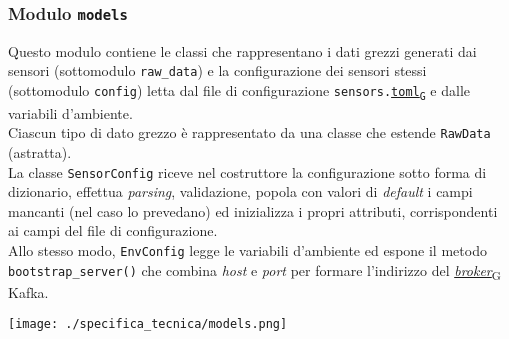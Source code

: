 \subsubsection{Modulo \texttt{models}}
Questo modulo contiene le classi che rappresentano i dati grezzi generati dai sensori (sottomodulo \texttt{raw\_data}) e la configurazione dei sensori stessi (sottomodulo \texttt{config}) letta
dal file di configurazione \texttt{sensors.\href{https://7last.github.io/docs/pb/documentazione-interna/glossario\#tom's-obvious-minimal-language}{toml\textsubscript{G}}} e dalle variabili d'ambiente.\\
Ciascun tipo di dato grezzo è rappresentato da una classe che estende \texttt{RawData} (astratta).\\
La classe \texttt{SensorConfig} riceve nel costruttore la configurazione sotto forma di dizionario, effettua \textit{parsing}, validazione,
popola con valori di \textit{default} i campi mancanti (nel caso lo prevedano) ed inizializza i propri attributi, corrispondenti ai campi del file di configurazione.\\
Allo stesso modo, \texttt{EnvConfig} legge le variabili d'ambiente ed espone il metodo \\\texttt{bootstrap\_server()} che combina \textit{host} e \textit{port} per formare l'indirizzo del \href{https://7last.github.io/docs/pb/documentazione-interna/glossario\#broker}{\textit{broker}\textsubscript{G}} Kafka.\\
\begin{center}
	\texttt{[image: ./specifica\_tecnica/models.png]}
\end{center}

